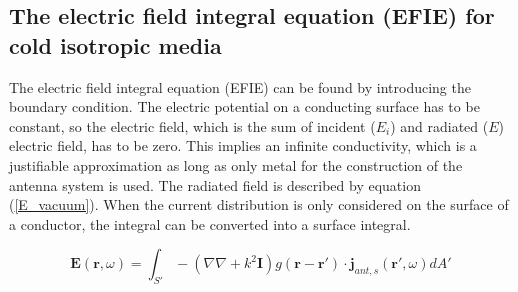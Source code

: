 \documentclass[a4paper,11pt]{thesis}
\begin{document}


\subsection{The electric field integral equation (EFIE) for cold isotropic media}
The electric field integral equation (EFIE) can be found by introducing the boundary condition. The electric potential on a conducting surface has to be constant, so the electric field, which is the sum of incident ($E_i$) and radiated ($E$) electric field, has to be zero. This implies an infinite conductivity, which is a justifiable approximation as long as only metal for the construction of the antenna system is used. The radiated field is described by equation (\ref{E_vacuum}). When the current distribution is only considered on the surface of a conductor, the integral can be converted into a surface integral.

\begin{equation}
    \mathbf{E}(\mathbf{r},\omega)=\int_{S'} -\left(  \nabla  \nabla   + k^2 \mathbf{I} \right) g(\mathbf{r}-\mathbf{r'})\cdot \mathbf{j}_{ant,s}(\mathbf{r'},\omega) dA'
\end{equation}
\end{document}
